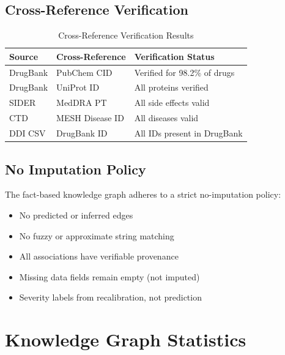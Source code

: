 \documentclass[11pt,a4paper]{article}
\begin{document}
\subsection{Cross-Reference Verification}

\begin{table}[h]
\centering
\caption{Cross-Reference Verification Results}
\begin{tabular}{@{}lll@{}}
\toprule
\textbf{Source} & \textbf{Cross-Reference} & \textbf{Verification Status} \\
\midrule
DrugBank & PubChem CID & Verified for 98.2\% of drugs \\
DrugBank & UniProt ID & All proteins verified \\
SIDER & MedDRA PT & All side effects valid \\
CTD & MESH Disease ID & All diseases valid \\
DDI CSV & DrugBank ID & All IDs present in DrugBank \\
\bottomrule
\end{tabular}
\end{table}

\subsection{No Imputation Policy}

The fact-based knowledge graph adheres to a strict no-imputation policy:

\begin{itemize}
    \item No predicted or inferred edges
    \item No fuzzy or approximate string matching
    \item All associations have verifiable provenance
    \item Missing data fields remain empty (not imputed)
    \item Severity labels from recalibration, not prediction
\end{itemize}

\newpage
\section{Knowledge Graph Statistics}
\label{sec:kg_stats}
\end{document}
